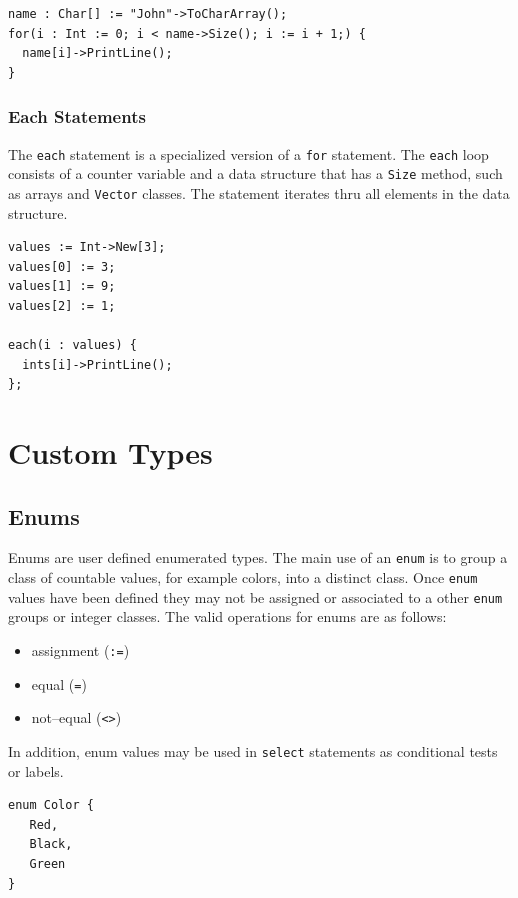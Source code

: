 \documentclass[12pt]{article}
\begin{document}
\begin{verbatim}
name : Char[] := "John"->ToCharArray();
for(i : Int := 0; i < name->Size(); i := i + 1;) {
  name[i]->PrintLine();
}
\end{verbatim}

\subsubsection{Each Statements}

The \texttt{each} statement is a specialized version of a \texttt{for} statement.  The \texttt{each} loop consists of a counter variable and a data structure that has a \texttt{Size} method, such as arrays and \texttt{Vector} classes.  The statement iterates thru all elements in the data structure.

\begin{verbatim}
values := Int->New[3];
values[0] := 3;
values[1] := 9;
values[2] := 1;

each(i : values) {
  ints[i]->PrintLine();
};
\end{verbatim}

\section{Custom Types}

\subsection{Enums}
Enums are user defined enumerated types.  The main use of an  \texttt{enum}  is to group a class of countable values, for example colors, into a distinct class.  Once \texttt{enum}  values have been defined they may not be assigned or associated to a other \texttt{enum}  groups or integer classes.  The valid operations for enums are as follows:

\begin{itemize}
    \item assignment (\texttt{:=})
    \item equal (\texttt{=})
    \item not--equal (\texttt{<>})
\end{itemize}

In addition, enum values may be used in \texttt{select} statements as conditional tests or labels.

\begin{verbatim}
enum Color {
   Red,
   Black,
   Green
}
\end{verbatim}
\end{document}
